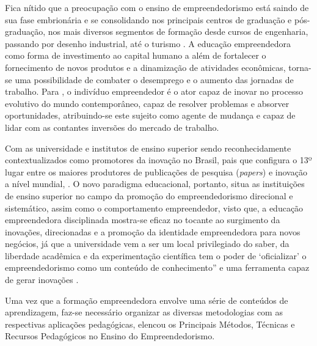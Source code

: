 \clearpage


Fica nítido que a preocupação com o ensino de empreendedorismo está saindo de sua fase embrionária e se consolidando nos principais centros de graduação e pós-graduação, nos mais diversos segmentos de formação desde cursos de engenharia, passando por desenho industrial, até o turismo \cite{henrique_praticas_2008}. A educação empreendedora como forma de investimento ao capital humano a além de fortalecer o fornecimento de novos produtos e a dinamização de atividades  econômicas, torna-se uma possibilidade de combater o desemprego \cite{morais_empreendedorismo_2018} e o aumento das jornadas de trabalho. Para , o indivíduo empreendedor é o ator capaz de inovar no processo evolutivo do mundo contemporâneo, capaz de resolver problemas e absorver oportunidades, atribuindo-se este sujeito como agente de mudança e capaz de lidar com as contantes inversões do mercado de trabalho. 

Com as universidade e institutos de ensino superior sendo reconhecidamente contextualizados como promotores da inovação no Brasil, pais que configura o 13º lugar entre os maiores produtores de publicações de pesquisa (\textit{papers}) e inovação a nível mundial, .  O novo paradigma educacional, portanto, situa as instituições de ensino superior no campo da promoção do empreendedorismo direcional e sistemático, assim como o comportamento empreendedor, visto que, a educação empreendedora disciplinada mostra-se eficaz no tocante ao surgimento da inovações, direcionadas e a promoção da identidade empreendedora para novos negócios, \cite{jain_academics_2009} já que a universidade vem a ser um local privilegiado do saber, da liberdade acadêmica e da experimentação científica tem o poder de ‘oficializar’ o empreendedorismo como um conteúdo de conhecimento” e uma ferramenta capaz de gerar inovações \cite{dolabela_oficina_2008}. 

Uma vez que a formação empreendedora envolve uma série de conteúdos de aprendizagem, faz-se necessário organizar as diversas metodologias com as respectivas aplicações pedagógicas, \cite{rocha_avaliacao_2014} elencou os Principais Métodos, Técnicas e Recursos Pedagógicos no Ensino do Empreendedorismo. 



